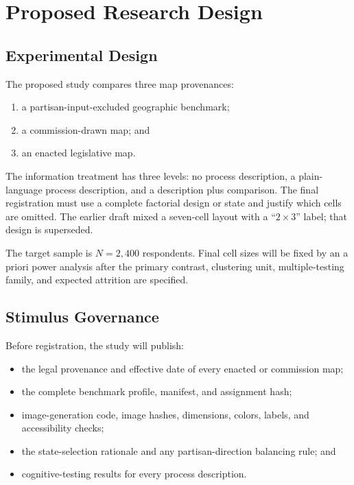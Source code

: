 \section{Proposed Research Design}
\label{sec:design}

\subsection{Experimental Design}

The proposed study compares three map provenances:

\begin{enumerate}
\item a partisan-input-excluded geographic benchmark;
\item a commission-drawn map; and
\item an enacted legislative map.
\end{enumerate}

The information treatment has three levels: no process description, a
plain-language process description, and a description plus comparison. The
final registration must use a complete factorial design or state and justify
which cells are omitted. The earlier draft mixed a seven-cell layout with a
``$2\times3$'' label; that design is superseded.

The target sample is $N=2{,}400$ respondents. Final cell sizes will be fixed by
an a priori power analysis after the primary contrast, clustering unit,
multiple-testing family, and expected attrition are specified.

\subsection{Stimulus Governance}

Before registration, the study will publish:

\begin{itemize}
\item the legal provenance and effective date of every enacted or commission
map;
\item the complete benchmark profile, manifest, and assignment hash;
\item image-generation code, image hashes, dimensions, colors, labels, and
accessibility checks;
\item the state-selection rationale and any partisan-direction balancing rule;
and
\item cognitive-testing results for every process description.
\end{itemize}

